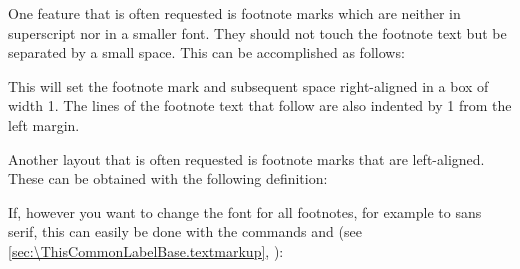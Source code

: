 \IfThisCommonFirstRun{\iftrue}{\csname iffalse\endcsname}%
  \begin{Example}
    One feature that is often requested is footnote marks
    which are neither in superscript nor in a smaller font. They should not
    touch the footnote text but be separated by a small space. This can be
    accomplished as follows:
\begin{lstcode}
\end{lstcode}
    This will set the footnote mark and subsequent space right-aligned in a 
    box of width 1. The lines of the footnote text that follow are 
    also indented by 1 from the left margin.

    Another layout that is often requested is footnote marks
    that are left-aligned. These can be obtained with the following
    definition:
\begin{lstcode}
\end{lstcode}
  
    If, however you want to change the font for all footnotes, for example
    to sans serif, this can easily be done with the commands
     and
     (see
    \autoref{sec:\ThisCommonLabelBase.textmarkup},
    ):
\begin{lstcode}
\end{lstcode}
  \end{Example}%
\fi%
%
%
\EndIndexGroup
\EndIndexGroup

